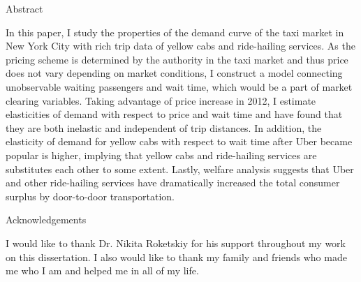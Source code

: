 \begin{center}
\large Abstract
\end{center}

\indent In this paper, I study the properties of the demand curve of the taxi market in New York City with rich trip data of yellow cabs and ride-hailing services. As the pricing scheme is determined by the authority in the taxi market and thus price does not vary depending on market conditions, I construct a model connecting unobservable waiting passengers and wait time, which would be a part of market clearing variables. Taking advantage of price increase in 2012, I estimate elasticities of demand with respect to price and wait time and have found that they are both inelastic and independent of trip distances. In addition, the elasticity of demand for yellow cabs with respect to wait time after Uber became popular is higher, implying that yellow cabs and ride-hailing services are substitutes each other to some extent. Lastly, welfare analysis suggests that Uber and other ride-hailing services have dramatically increased the total consumer surplus by door-to-door transportation.



\vfill

\begin{center}
\large Acknowledgements
\end{center}

\indent I would like to thank Dr. Nikita Roketskiy for his support throughout my work on this dissertation. I also would like to thank my family and friends who made me who I am and helped me in all of my life.


\vspace{5.0cm}
